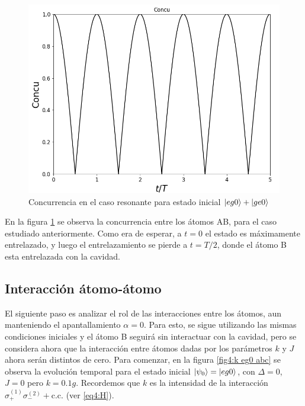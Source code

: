 \begin{figure}[H]
    \begin{minipage}[c]{0.67\textwidth}
        \includegraphics[width=\textwidth]{figuras/ch4/d eg0+ concu d=0.png}
    \end{minipage}\hfill
    \begin{minipage}[c]{0.3\textwidth}
    \caption{Concurrencia en el caso resonante para estado inicial $\ket{eg0}+\ket{ge0}$
         } \label{fig4:concu eg0 sim}
  \end{minipage}
\end{figure}
En la figura \ref{fig4:concu eg0 sim} se observa la concurrencia entre los átomos AB, para el caso estudiado anteriormente. Como era de esperar, a $t=0$ el estado es máximamente entrelazado, y luego el entrelazamiento se pierde a $t=T/2$, donde el átomo B esta entrelazada con la cavidad. 

\subsection{Interacción átomo-átomo}

El siguiente paso es analizar el rol de las interacciones entre los átomos, aun manteniendo el apantallamiento $\alpha=0$. Para esto, se sigue utilizando las mismas condiciones iniciales y el átomo B seguirá sin interactuar con la cavidad, pero se considera ahora que la interacción entre átomos dadas por los parámetros $k$ y $J$ ahora serán distintos de cero. Para comenzar, en la figura \ref{fig4:k eg0 abc} se observa la evolución temporal para el estado inicial $\ket{\psi_0}=\ket{eg0}$, con $\Delta = 0$, $J=0$ pero $k=0.1g$. Recordemos que $k$ es la intensidad de la interacción $\sigma^{(1)}_+\sigma^{(2)}_-+\text{c.c.}$ (ver \ref{eq4:H}).

